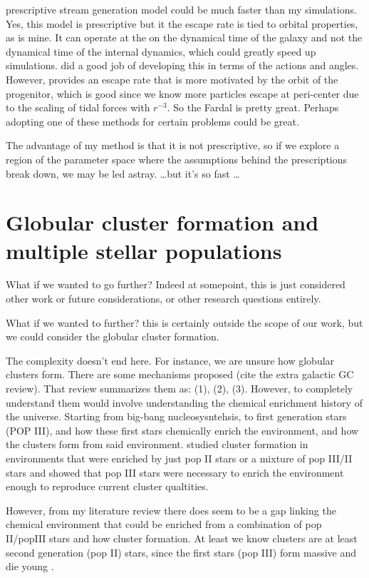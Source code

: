 \citet{2015MNRAS.452..301F} prescriptive stream generation model could be much faster than my simulations. Yes, this model is prescriptive but it the escape rate is tied to orbital properties, as is mine. It can operate at the on the dynamical time of the galaxy and not the dynamical time of the internal dynamics, which could greatly speed up simulations. \citet{2014ApJ...795...95B} did a good job of developing this in terms of the actions and angles. However, \citet{2015MNRAS.452..301F} provides an escape rate that is more motivated by the orbit of the progenitor, which is good since we know more particles escape at peri-center due to the scaling of tidal forces with $r^{-3}$. So the Fardal is pretty great. Perhaps adopting one of these methods for certain problems could be great. 

The advantage of my method is that it is not prescriptive, so if we explore a region of the parameter space where the assumptions behind the prescriptions break down, we may be led astray. \dots but it's so fast \dots 

\section{Globular cluster formation and multiple stellar populations}

    What if we wanted to go further? Indeed at somepoint, this is just considered other work or future considerations, or other research questions entirely. 

    What if we wanted to further? this is certainly outside the scope of our work, but we could consider the globular cluster formation. 

    The complexity doesn't end here. For instance, we are unsure how globular clusters form. There are some mechanisms proposed (cite the extra galactic GC review). That review summarizes them as: (1), (2), (3). However, to completely understand them would involve understanding the chemical enrichment history of the universe. Starting from big-bang nucleosysntehsis, to first generation stars (POP III), and how these first stars chemically enrich the environment, and how the clusters form from said environment. \citet{2022A&A...668A.191C} studied cluster formation in environments that were enriched by just pop II stars or a mixture of pop III/II stars and showed that pop III stars were necessary to enrich the environment enough to reproduce current cluster qualtities. 

    However, from my literature review there does seem to be a gap linking the chemical environment that could be enriched from a combination of pop II/popIII stars and how cluster formation. At least we know clusters are at least second generation (pop II) stars, since the first stars (pop III) form massive and die young \citep{2002ApJ...571...30S}.

